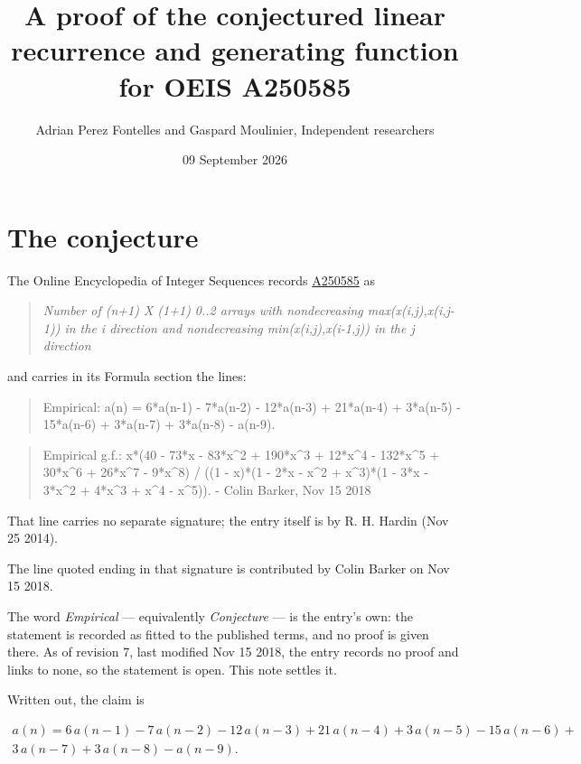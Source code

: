 \documentclass[11pt]{article}
\title{A proof of the conjectured linear recurrence and generating function for OEIS A250585}
\author{Adrian Perez Fontelles and Gaspard Moulinier, Independent researchers}
\date{09 September 2026}
\theoremstyle{definition}
\begin{document}
\maketitle
\section{The conjecture}

The Online Encyclopedia of Integer Sequences records \href{https://oeis.org/A250585}{A250585} as

\begin{quote}\itshape Number of (n+1) X (1+1) 0..2 arrays with nondecreasing max(x(i,j),x(i,j-1)) in the i direction and nondecreasing min(x(i,j),x(i-1,j)) in the j direction\end{quote}

and carries in its Formula section the lines:

\begin{quote}\ttfamily Empirical: a(n) = 6*a(n-1) - 7*a(n-2) - 12*a(n-3) + 21*a(n-4) + 3*a(n-5) - 15*a(n-6) + 3*a(n-7) + 3*a(n-8) - a(n-9).\end{quote}

\begin{quote}\ttfamily Empirical g.f.: x*(40 - 73*x - 83*x\textasciicircum{}2 + 190*x\textasciicircum{}3 + 12*x\textasciicircum{}4 - 132*x\textasciicircum{}5 + 30*x\textasciicircum{}6 + 26*x\textasciicircum{}7 - 9*x\textasciicircum{}8) / ((1 - x)*(1 - 2*x - x\textasciicircum{}2 + x\textasciicircum{}3)*(1 - 3*x - 3*x\textasciicircum{}2 + 4*x\textasciicircum{}3 + x\textasciicircum{}4 - x\textasciicircum{}5)). - Colin Barker, Nov 15 2018\end{quote}

That line carries no separate signature; the entry itself is by R. H. Hardin (Nov 25 2014).

The line quoted ending in that signature is contributed by Colin Barker on Nov 15 2018.

The word {\itshape Empirical} --- equivalently {\itshape Conjecture} --- is the entry's own: the statement is recorded as fitted to the published terms, and no proof is given there. As of revision 7, last modified Nov 15 2018, the entry records no proof and links to none, so the statement is open. This note settles it.

Written out, the claim is

\begin{multline*} a(n) = 6\,a(n-1) - 7\,a(n-2) - 12\,a(n-3) + 21\,a(n-4) + 3\,a(n-5) - 15\,a(n-6) + \\ 3\,a(n-7) + 3\,a(n-8) - a(n-9). \end{multline*}
\end{document}
